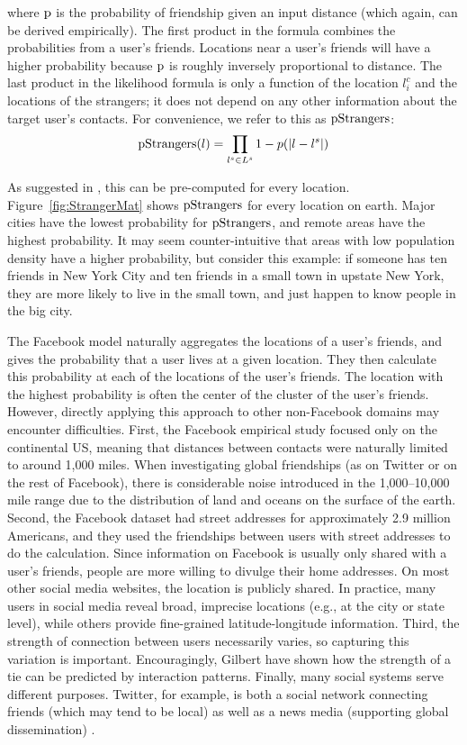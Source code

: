 \noindent where $\operatorname{p}$ is the probability of friendship given an input distance
(which again, can be derived empirically).
%
The first product in the formula combines the probabilities from a user's friends.
%
Locations near a user's friends will have a higher probability because $\operatorname{p}$ is
roughly inversely proportional to distance.
%
The last product in the likelihood formula is only a function of the location
$l^c_i$ and the locations of the strangers; it does not depend on any other
information about the target user's contacts.
%
For convenience, we refer to this as $\operatorname{pStrangers}$:
\[
    \operatorname{pStrangers}(l) = \prod_{l^s \in L^s}1-p(|l-l^s|)
\]

\noindent As suggested in \cite{backstrom2010find}, this can be pre-computed
for every location.
%
Figure~\ref{fig:StrangerMat} shows $\operatorname{pStrangers}$ for every location on earth.
%
Major cities have the lowest probability for
$\operatorname{pStrangers}$, and remote areas have the highest probability.  It may seem
counter-intuitive that areas with low population density have a higher
probability, but consider this example: if someone has ten friends in New York
City and ten friends in a small town in upstate New York, they are more likely
to live in the small town, and just happen to know people in the big city.

The Facebook model naturally aggregates the locations of a user's friends, and
gives the probability that a user lives at a given location.
%
They then calculate this probability at each of the locations of the user's friends.
%
The location with the highest probability is often the center of the cluster of
the user's friends.
%
However, directly applying this approach to other non-Facebook domains may
encounter difficulties.
%
First, the Facebook empirical study focused only on the continental US, meaning
that distances between contacts were naturally limited to around 1,000 miles.
%
When investigating global friendships (as on Twitter or on the rest of
Facebook), there is considerable noise introduced in the 1,000--10,000 mile
range due to the distribution of land and oceans on the surface of the earth.
%
Second, the Facebook dataset had street addresses for approximately 2.9 million
Americans, and they used the friendships between users with street addresses to
do the calculation.
%
Since information on Facebook is usually only shared with a user's friends,
people are more willing to divulge their home addresses.
%
On most other social media websites, the location is publicly shared.
%
In practice, many users in social media reveal broad, imprecise
locations (e.g., at the city or state level), while others provide fine-grained
latitude-longitude information.
%
Third, the strength of connection between users necessarily varies, so
capturing this variation is important.
%
Encouragingly, Gilbert \cite{gilbert2009predicting} have shown how the strength
of a tie can be predicted by interaction patterns.
%
Finally, many social systems serve different purposes.
%
Twitter, for example, is both a social network connecting friends (which may
tend to be local) as well as a news media (supporting global dissemination)
\cite{kwak2010why}.



